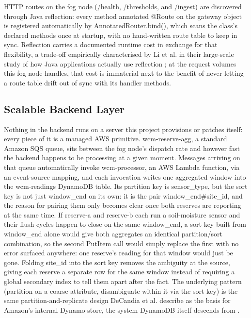 \documentclass[conference,a4paper]{IEEEtran}
\begin{document}
HTTP routes on the fog node (/health, /thresholds, and /ingest) are discovered through Java reflection: every method annotated @Route on the gateway object is registered automatically by AnnotatedRouter.bind(), which scans the class's declared methods once at startup, with no hand-written route table to keep in sync. Reflection carries a documented runtime cost in exchange for that flexibility, a trade-off empirically characterised by Li et al. in their large-scale study of how Java applications actually use reflection \cite{ref5}; at the request volumes this fog node handles, that cost is immaterial next to the benefit of never letting a route table drift out of sync with its handler methods.

\subsection{Scalable Backend Layer}

Nothing in the backend runs on a server this project provisions or patches itself: every piece of it is a managed AWS primitive. wcm-reserve-agg, a standard Amazon SQS queue, sits between the fog node's dispatch rate and however fast the backend happens to be processing at a given moment. Messages arriving on that queue automatically invoke wcm-processor, an AWS Lambda function, via an event-source mapping, and each invocation writes one aggregated window into the wcm-readings DynamoDB table. Its partition key is sensor\_type, but the sort key is not just window\_end on its own: it is the pair window\_end\#site\_id, and the reason for pairing them only becomes clear once both reserves are reporting at the same time. If reserve-a and reserve-b each run a soil-moisture sensor and their flush cycles happen to close on the same window\_end, a sort key built from window\_end alone would give both aggregates an identical partition/sort combination, so the second PutItem call would simply replace the first with no error surfaced anywhere: one reserve's reading for that window would just be gone. Folding site\_id into the sort key removes the ambiguity at the source, giving each reserve a separate row for the same window instead of requiring a global secondary index to tell them apart after the fact. The underlying pattern (partition on a coarse attribute, disambiguate within it via the sort key) is the same partition-and-replicate design DeCandia et al. describe as the basis for Amazon's internal Dynamo store, the system DynamoDB itself descends from \cite{ref6}.
\end{document}

